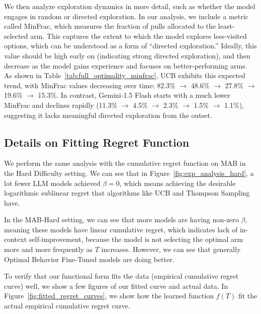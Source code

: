 We then analyze exploration dynamics in more detail, such as whether the model engages in random or directed exploration. In our analysis, we include a metric called MinFrac, which measures the fraction of pulls allocated to the least-selected arm. This captures the extent to which the model explores less-visited options, which can be understood as a form of “directed exploration.” Ideally, this value should be high early on (indicating strong directed exploration), and then decrease as the model gains experience and focuses on better-performing arms.
As shown in Table~\ref{tab:full_optimality_minfrac}, UCB exhibits this expected trend, with MinFrac values decreasing over time: 82.3\% $\rightarrow$ 48.6\% $\rightarrow$ 27.8\% $\rightarrow$ 19.6\% $\rightarrow$ 15.3\%. In contrast, Gemini-1.5 Flash starts with a much lower MinFrac and declines rapidly (11.3\% $\rightarrow$ 4.5\% $\rightarrow$ 2.3\% $\rightarrow$ 1.5\% $\rightarrow$ 1.1\%), suggesting it lacks meaningful directed exploration from the outset. 


\subsection{Details on Fitting Regret Function}


We perform the same analysis with the cumulative regret function on MAB in the Hard Difficulty setting. We can see that in Figure~\ref{fig:exp_analysis_hard}, a lot fewer LLM models achieved $\beta=0$, which means achieving the desirable logarithmic sublinear regret that algorithms like UCB and Thompson Sampling have. 

In the MAB-Hard setting, we can see that more models are having non-zero $\beta$, meaning these models have linear cumulative regret, which indicates lack of in-context self-improvement, because the model is not selecting the optimal arm more and more frequently as $T$ increases. However, we can see that generally Optimal Behavior Fine-Tuned models are doing better.

To verify that our functional form fits the data (empirical cumulative regret curve) well, we show a few figures of our fitted curve and actual data. In Figure~\ref{fig:fitted_regret_curves},
we show how the learned function $f(T)$ fit the actual empirical cumulative regret curve.


